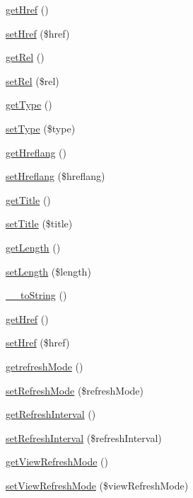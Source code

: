 \begin{DoxyCompactItemize}
\item 
\hyperlink{classLink_aee382b91ddaf73b3c0a5350179da763a}{getHref} ()
\item 
\hyperlink{classLink_a40a7adb08764f0a474846eb129781985}{setHref} (\$href)
\item 
\hyperlink{classLink_afed038114c678fe1f299e46d87241cbb}{getRel} ()
\item 
\hyperlink{classLink_af5c34eab3e34505ff30e9ee8e3273584}{setRel} (\$rel)
\item 
\hyperlink{classLink_a8b26a772a71c29506157c3e848a5be72}{getType} ()
\item 
\hyperlink{classLink_ab343c3a6403dec9b1593dba73a84fb56}{setType} (\$type)
\item 
\hyperlink{classLink_a671b35d29e57f150c879d881809ce6a3}{getHreflang} ()
\item 
\hyperlink{classLink_a92cc397f851432f99361d10f85dc4df1}{setHreflang} (\$hreflang)
\item 
\hyperlink{classLink_afb1a85b6179b169c367337e7954bce33}{getTitle} ()
\item 
\hyperlink{classLink_a64ba92c3efd2a118480e7eaabdf045f4}{setTitle} (\$title)
\item 
\hyperlink{classLink_a89339d578621892887a3f4417956ecf1}{getLength} ()
\item 
\hyperlink{classLink_a2a838bce55062fe78dfbc985bb5272fa}{setLength} (\$length)
\item 
\hyperlink{classLink_a697a2ff9eefcd90a71051ae58c6ca364}{\_\-\_\-toString} ()
\item 
\hyperlink{classLink_aee382b91ddaf73b3c0a5350179da763a}{getHref} ()
\item 
\hyperlink{classLink_a40a7adb08764f0a474846eb129781985}{setHref} (\$href)
\item 
\hyperlink{classLink_a8ecc44724fe4986e1f7ddbf4212dc8b5}{getrefreshMode} ()
\item 
\hyperlink{classLink_ab6bc55321d9eeaf34503d93fb71492ae}{setRefreshMode} (\$refreshMode)
\item 
\hyperlink{classLink_a6187b72b9ac95fc8de08bead8044c14f}{getRefreshInterval} ()
\item 
\hyperlink{classLink_ac696ced38960a2fab803c951c255c5c4}{setRefreshInterval} (\$refreshInterval)
\item 
\hyperlink{classLink_a8de11692897930191412f1557f2e68bc}{getViewRefreshMode} ()
\item 
\hyperlink{classLink_acd4305075ce6471e23259ab65f9b3a1d}{setViewRefreshMode} (\$viewRefreshMode)

\end{DoxyCompactItemize}
